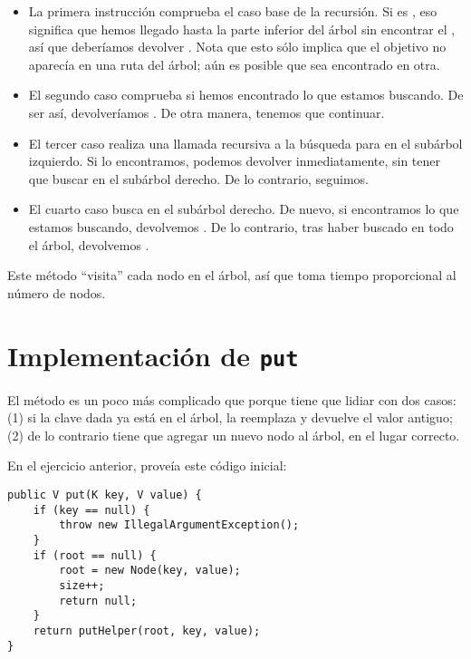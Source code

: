 \documentclass[12pt]{book}
\theoremstyle{exercise}
\begin{document}
\begin{itemize}

\item
  La primera instrucción  comprueba el caso base de la recursión.
  Si  es , eso significa que hemos llegado hasta la
  parte inferior del árbol sin encontrar el , así que deberíamos
  devolver . Nota que esto sólo implica que el objetivo no
  aparecía en una ruta del árbol; aún es posible que sea encontrado en otra.

\item
  El segundo caso comprueba si hemos encontrado lo que estamos buscando. De ser
  así, devolveríamos . De otra manera, tenemos que continuar.

\item
  El tercer caso realiza una llamada recursiva a la búsqueda para  en
  el subárbol izquierdo. Si lo encontramos, podemos devolver 
  inmediatamente, sin tener que buscar en el subárbol derecho. De lo contrario,
  seguimos.

\item
  El cuarto caso busca en el subárbol derecho. De nuevo, si encontramos lo que
  estamos buscando, devolvemos . De lo contrario, tras haber buscado
  en todo el árbol, devolvemos .

\end{itemize}

Este método ``visita'' cada nodo en el árbol, así que toma tiempo
proporcional al número de nodos.



\section{Implementación de {\tt put}}
\label{implementing-put}

El método  es un poco más complicado que 
porque tiene que lidiar con dos casos: (1) si la clave dada ya
está en el árbol, la reemplaza y devuelve el valor antiguo; (2) de lo
contrario tiene que agregar un nuevo nodo al árbol, en el lugar correcto.


En el ejercicio anterior, proveía este código inicial:

\begin{verbatim}
public V put(K key, V value) {
    if (key == null) {
        throw new IllegalArgumentException();
    }
    if (root == null) {
        root = new Node(key, value);
        size++;
        return null;
    }
    return putHelper(root, key, value);
}
\end{verbatim}
\end{document}
